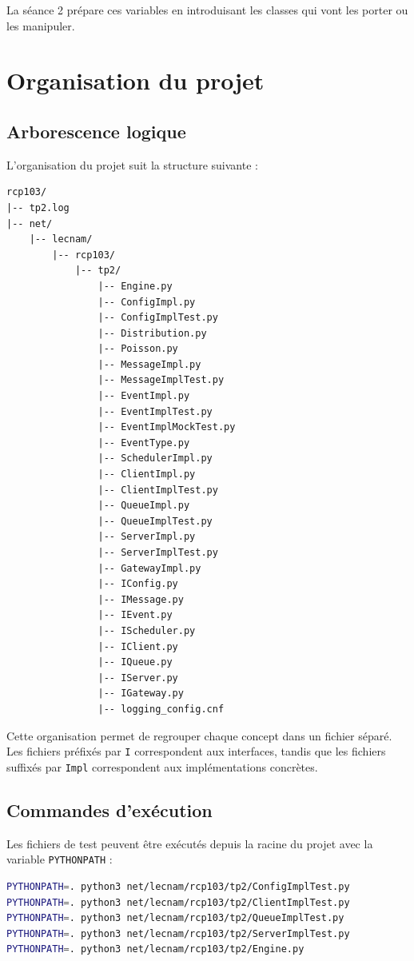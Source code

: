 \documentclass{article}
\begin{document}
La séance 2 prépare ces variables en introduisant les classes qui vont les porter ou les manipuler.

\section{Organisation du projet}

\subsection{Arborescence logique}

L’organisation du projet suit la structure suivante :

\begin{verbatim}
rcp103/
|-- tp2.log
|-- net/
    |-- lecnam/
        |-- rcp103/
            |-- tp2/
                |-- Engine.py
                |-- ConfigImpl.py
                |-- ConfigImplTest.py
                |-- Distribution.py
                |-- Poisson.py
                |-- MessageImpl.py
                |-- MessageImplTest.py
                |-- EventImpl.py
                |-- EventImplTest.py
                |-- EventImplMockTest.py
                |-- EventType.py
                |-- SchedulerImpl.py
                |-- ClientImpl.py
                |-- ClientImplTest.py
                |-- QueueImpl.py
                |-- QueueImplTest.py
                |-- ServerImpl.py
                |-- ServerImplTest.py
                |-- GatewayImpl.py
                |-- IConfig.py
                |-- IMessage.py
                |-- IEvent.py
                |-- IScheduler.py
                |-- IClient.py
                |-- IQueue.py
                |-- IServer.py
                |-- IGateway.py
                |-- logging_config.cnf
\end{verbatim}

Cette organisation permet de regrouper chaque concept dans un fichier séparé. Les fichiers préfixés par \texttt{I} correspondent aux interfaces, tandis que les fichiers suffixés par \texttt{Impl} correspondent aux implémentations concrètes.

\subsection{Commandes d’exécution}

Les fichiers de test peuvent être exécutés depuis la racine du projet avec la variable \texttt{PYTHONPATH} :

\begin{lstlisting}[language=bash, caption=Exécution des tests sous Linux ou WSL]
PYTHONPATH=. python3 net/lecnam/rcp103/tp2/ConfigImplTest.py
PYTHONPATH=. python3 net/lecnam/rcp103/tp2/ClientImplTest.py
PYTHONPATH=. python3 net/lecnam/rcp103/tp2/QueueImplTest.py
PYTHONPATH=. python3 net/lecnam/rcp103/tp2/ServerImplTest.py
PYTHONPATH=. python3 net/lecnam/rcp103/tp2/Engine.py
\end{lstlisting}
\end{document}
